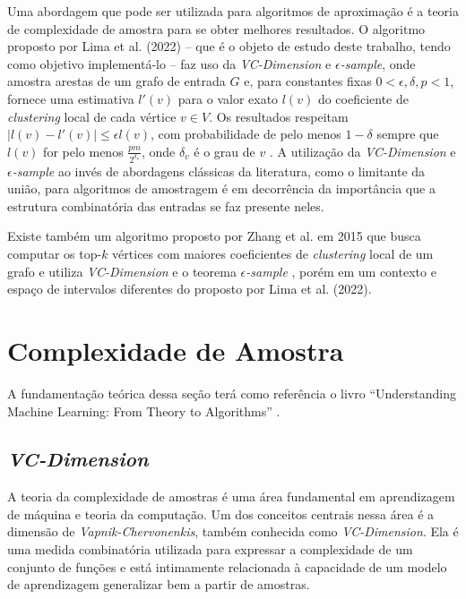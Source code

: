 Uma abordagem que pode ser utilizada para algoritmos de aproximação é a teoria de
complexidade de amostra para se obter melhores resultados. O algoritmo proposto por Lima et al. (2022) – que é o objeto de estudo deste trabalho, tendo como objetivo implementá-lo – faz uso da \textit{VC-Dimension} e \textit{$\epsilon$-sample}, onde amostra arestas de um grafo de entrada $G$ e, para
constantes fixas $0 < \epsilon,\delta,p < 1$, fornece uma estimativa $l'(v)$ para o valor exato $l(v)$ do coeficiente de \textit{clustering} local de cada vértice $v \in V$. Os resultados respeitam $|l(v)-l'(v)| \leq \epsilon l(v)$, com probabilidade de pelo menos $1 - \delta$ sempre que $l(v)$ for pelo menos $\frac{pm}{2^{\delta_v}}$, onde $\delta_v$ é o grau de $v$ \cite[64--65]{Lima2022}. A utilização da \textit{VC-Dimension} e \textit{$\epsilon$-sample} ao invés de abordagens clássicas da literatura, como o limitante da união, para algoritmos de amostragem é em decorrência da importância que a estrutura combinatória das entradas se faz presente neles.

Existe também um algoritmo proposto por Zhang et al. em 2015 que busca computar os top-$k$ vértices com maiores coeficientes de \textit{clustering} local de um grafo e utiliza \textit{VC-Dimension} e o teorema \textit{$\epsilon$-sample} \cite[1445--1454]{Zhang2015}, porém em um contexto e espaço de intervalos diferentes do proposto por Lima et al. (2022).

\section{Complexidade de Amostra}\label{sec:complex_amostra}

A fundamentação teórica dessa seção terá como referência o livro “Understanding
Machine Learning: From Theory to Algorithms” \cite{Shalev2014}.

\subsection{\textit{VC-Dimension}}\label{subsec:vc_dimension}

A teoria da complexidade de amostras é uma área fundamental em aprendizagem de máquina e teoria da computação. Um dos conceitos centrais nessa área é a dimensão de \textit{Vapnik-Chervonenkis}, também conhecida como \textit{VC-Dimension}. Ela é uma medida combinatória utilizada para expressar a complexidade de um conjunto de funções e está intimamente relacionada à capacidade de um modelo de aprendizagem generalizar bem a partir de amostras.

